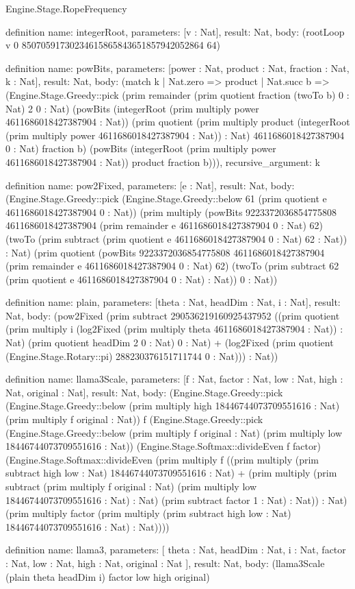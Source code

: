 \begin{lexlean}{Engine.Stage.RopeFrequency}
\begin{semanticmodule}
definition{
  name: integerRoot,
  parameters: [v : Nat],
  result: Nat,
  body: (rootLoop v 0 85070591730234615865843651857942052864 64)
}

definition{
  name: powBits,
  parameters: [power : Nat, product : Nat, fraction : Nat, k : Nat],
  result: Nat,
  body: (match k
    | Nat.zero => product
    | Nat.succ b => (Engine.Stage.Greedy::pick (prim remainder (prim quotient fraction (twoTo b) 0 : Nat) 2 0 : Nat) (powBits (integerRoot (prim multiply power 4611686018427387904 : Nat)) (prim quotient (prim multiply product (integerRoot (prim multiply power 4611686018427387904 : Nat)) : Nat) 4611686018427387904 0 : Nat) fraction b) (powBits (integerRoot (prim multiply power 4611686018427387904 : Nat)) product fraction b))),
  recursive_argument: k
}

definition{
  name: pow2Fixed,
  parameters: [e : Nat],
  result: Nat,
  body: (Engine.Stage.Greedy::pick (Engine.Stage.Greedy::below 61 (prim quotient e 4611686018427387904 0 : Nat)) (prim multiply (powBits 9223372036854775808 4611686018427387904 (prim remainder e 4611686018427387904 0 : Nat) 62) (twoTo (prim subtract (prim quotient e 4611686018427387904 0 : Nat) 62 : Nat)) : Nat) (prim quotient (powBits 9223372036854775808 4611686018427387904 (prim remainder e 4611686018427387904 0 : Nat) 62) (twoTo (prim subtract 62 (prim quotient e 4611686018427387904 0 : Nat) : Nat)) 0 : Nat))
}

definition{
  name: plain,
  parameters: [theta : Nat, headDim : Nat, i : Nat],
  result: Nat,
  body: (pow2Fixed (prim subtract 290536219160925437952 ((prim quotient (prim multiply i (log2Fixed (prim multiply theta 4611686018427387904 : Nat)) : Nat) (prim quotient headDim 2 0 : Nat) 0 : Nat) + (log2Fixed (prim quotient (Engine.Stage.Rotary::pi) 288230376151711744 0 : Nat))) : Nat))
}

definition{
  name: llama3Scale,
  parameters: [f : Nat, factor : Nat, low : Nat, high : Nat, original : Nat],
  result: Nat,
  body: (Engine.Stage.Greedy::pick (Engine.Stage.Greedy::below (prim multiply high 18446744073709551616 : Nat) (prim multiply f original : Nat)) f (Engine.Stage.Greedy::pick (Engine.Stage.Greedy::below (prim multiply f original : Nat) (prim multiply low 18446744073709551616 : Nat)) (Engine.Stage.Softmax::divideEven f factor) (Engine.Stage.Softmax::divideEven (prim multiply f ((prim multiply (prim subtract high low : Nat) 18446744073709551616 : Nat) + (prim multiply (prim subtract (prim multiply f original : Nat) (prim multiply low 18446744073709551616 : Nat) : Nat) (prim subtract factor 1 : Nat) : Nat)) : Nat) (prim multiply factor (prim multiply (prim subtract high low : Nat) 18446744073709551616 : Nat) : Nat))))
}

definition{
  name: llama3,
  parameters: [
    theta : Nat,
    headDim : Nat,
    i : Nat,
    factor : Nat,
    low : Nat,
    high : Nat,
    original : Nat
  ],
  result: Nat,
  body: (llama3Scale (plain theta headDim i) factor low high original)
}
\end{semanticmodule}
\end{lexlean}
